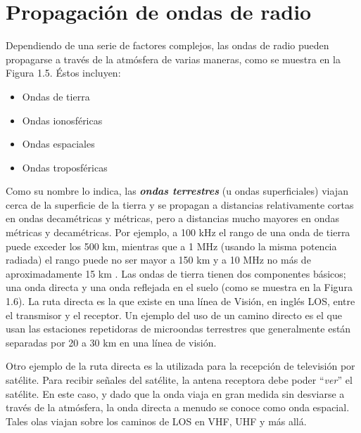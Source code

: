 \section{Propagación de ondas de radio}
\label{sec:A.07.propagacion.ondas.radio}

Dependiendo de una serie de factores complejos, las ondas de radio pueden propagarse a través de la atmósfera de varias maneras, como se muestra en la Figura 1.5. Éstos incluyen:

\begin{center}
  \begin{multicols}{2}
    \begin{itemize}
    \item Ondas de tierra
    \item Ondas ionosféricas
    \item Ondas espaciales
    \item Ondas troposféricas
    \end{itemize}
  \end{multicols}
\end{center}

Como su nombre lo indica, las \emph{\bf ondas terrestres} (u ondas superficiales) viajan cerca de la superficie de la tierra y se propagan a distancias relativamente cortas en ondas decamétricas y métricas, pero a distancias mucho mayores en ondas métricas y decamétricas. Por ejemplo, a 100 kHz el rango de una onda de tierra puede exceder los 500 km, mientras que a 1 MHz (usando la misma potencia radiada) el rango puede no ser mayor a 150 km y a 10 MHz no más de aproximadamente 15 km . Las ondas de tierra tienen dos componentes básicos; una onda directa y una onda reflejada en el suelo (como se muestra en la Figura 1.6). La ruta directa es la que existe en una línea de Visión, en ingl\'es  \ac{LOS}, entre el transmisor y el receptor. Un ejemplo del uso de un camino directo es el que usan las estaciones repetidoras de microondas terrestres que generalmente están separadas por 20 a 30 km en una línea de visión.

Otro ejemplo de la ruta directa es la utilizada para la recepción de televisi\'on por satélite. Para recibir señales del satélite, la antena receptora debe poder ``\emph{ver}'' el satélite. En este caso, y dado que la onda viaja en gran medida sin desviarse a través de la atmósfera, la onda directa a menudo se conoce como onda espacial. Tales olas viajan sobre los caminos de LOS en VHF, UHF y más allá.

